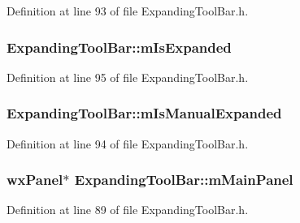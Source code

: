 Definition at line 93 of file Expanding\+Tool\+Bar.\+h.

\subsubsection[{\texorpdfstring{m\+Is\+Expanded}{mIsExpanded}}]{ Expanding\+Tool\+Bar\+::m\+Is\+Expanded\hspace{0.3cm}{\ttfamily [protected]}}\hypertarget{class_expanding_tool_bar_a644f8d5fc1f00d8d997093a7dedc873d}{}\label{class_expanding_tool_bar_a644f8d5fc1f00d8d997093a7dedc873d}


Definition at line 95 of file Expanding\+Tool\+Bar.\+h.

\subsubsection[{\texorpdfstring{m\+Is\+Manual\+Expanded}{mIsManualExpanded}}]{ Expanding\+Tool\+Bar\+::m\+Is\+Manual\+Expanded\hspace{0.3cm}{\ttfamily [protected]}}\hypertarget{class_expanding_tool_bar_af12c9e75db7c0a164a6d7d0ae62f3c66}{}\label{class_expanding_tool_bar_af12c9e75db7c0a164a6d7d0ae62f3c66}


Definition at line 94 of file Expanding\+Tool\+Bar.\+h.

\subsubsection[{\texorpdfstring{m\+Main\+Panel}{mMainPanel}}]{\setlength{\rightskip}{0pt plus 5cm}wx\+Panel$\ast$ Expanding\+Tool\+Bar\+::m\+Main\+Panel\hspace{0.3cm}{\ttfamily [protected]}}\hypertarget{class_expanding_tool_bar_ad37026b2559dd320a0d6322208432d8e}{}\label{class_expanding_tool_bar_ad37026b2559dd320a0d6322208432d8e}


Definition at line 89 of file Expanding\+Tool\+Bar.\+h.

